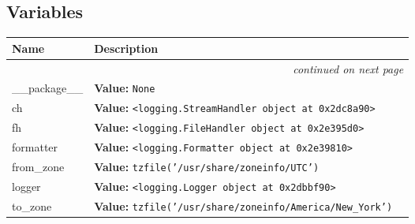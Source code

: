 
  \subsection{Variables}

    \vspace{-1cm}
\hspace{\varindent}\begin{longtable}{|p{\varnamewidth}|p{\vardescrwidth}|l}
\cline{1-2}
\cline{1-2} \centering \textbf{Name} & \centering \textbf{Description}& \\
\cline{1-2}
\endhead\cline{1-2}\multicolumn{3}{r}{\small\textit{continued on next page}}\\\endfoot\cline{1-2}
\endlastfoot\raggedright \_\-\_\-p\-a\-c\-k\-a\-g\-e\-\_\-\_\- & \raggedright \textbf{Value:} 
{\tt None}&\\
\cline{1-2}
\raggedright c\-h\- & \raggedright \textbf{Value:} 
{\tt {\textless}logging.StreamHandler object at 0x2dc8a90{\textgreater}}&\\
\cline{1-2}
\raggedright f\-h\- & \raggedright \textbf{Value:} 
{\tt {\textless}logging.FileHandler object at 0x2e395d0{\textgreater}}&\\
\cline{1-2}
\raggedright f\-o\-r\-m\-a\-t\-t\-e\-r\- & \raggedright \textbf{Value:} 
{\tt {\textless}logging.Formatter object at 0x2e39810{\textgreater}}&\\
\cline{1-2}
\raggedright f\-r\-o\-m\-\_\-z\-o\-n\-e\- & \raggedright \textbf{Value:} 
{\tt tzfile('/usr/share/zoneinfo/UTC')}&\\
\cline{1-2}
\raggedright l\-o\-g\-g\-e\-r\- & \raggedright \textbf{Value:} 
{\tt {\textless}logging.Logger object at 0x2dbbf90{\textgreater}}&\\
\cline{1-2}
\raggedright t\-o\-\_\-z\-o\-n\-e\- & \raggedright \textbf{Value:} 
{\tt tzfile('/usr/share/zoneinfo/America/New\_York')}&\\
\cline{1-2}
\end{longtable}




